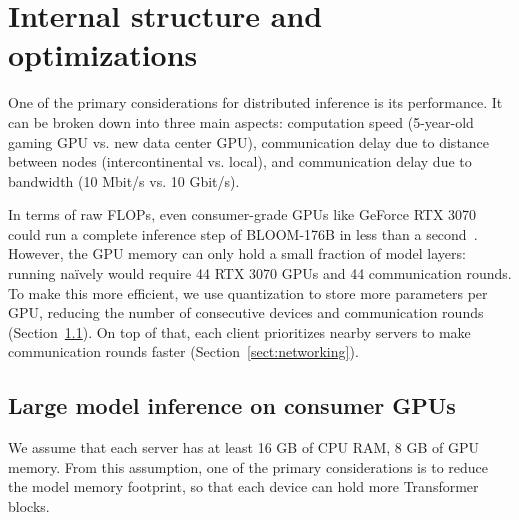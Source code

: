 \section{Internal structure and optimizations}\label{sect:internals}


One of the primary considerations for distributed inference is its performance. It can be broken down into three main aspects: computation speed (5-year-old gaming GPU vs. new data center GPU), communication delay due to distance between nodes (intercontinental vs. local), and communication delay due to bandwidth (10 Mbit/s vs. 10 Gbit/s).

In terms of raw FLOPs, even consumer-grade GPUs like GeForce RTX 3070 could run a complete inference step of BLOOM-176B in less than a second~\citep{ga102-datasheet}. However, the GPU memory can only hold a small fraction of model layers: running na\"ively would require 44 RTX 3070 GPUs and 44 communication rounds. To make this more efficient, we use quantization to store more parameters per GPU, reducing the number of consecutive devices and communication rounds (Section~\ref{sect:inside_gpu}). On top of that, each client prioritizes nearby servers to make communication rounds faster (Section~\ref{sect:networking}).



\subsection{Large model inference on consumer GPUs}\label{sect:inside_gpu}

We assume that each server has at least 16 GB of CPU RAM, 8 GB of GPU memory. From this assumption, one of the primary considerations is to reduce the model memory footprint, so that each device can hold more Transformer blocks.%


